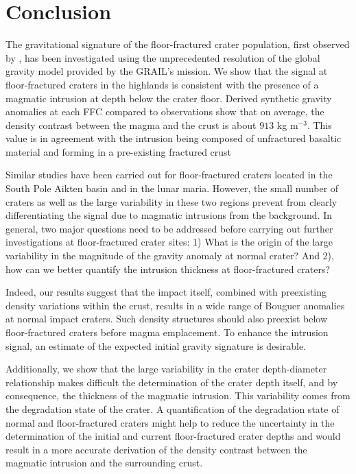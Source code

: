 \section{Conclusion}
\label{sec:conclusion}

The gravitational signature of  the floor-fractured crater population,
first observed by \citet{Schultz:1976kt},  has been investigated using
the unprecedented resolution  of the global gravity  model provided by
the  GRAIL's mission.   We  show that  the  signal at  floor-fractured
craters in the highlands is consistent with the presence of a magmatic
intrusion at depth below the  crater floor.  Derived synthetic gravity
anomalies at each  FFC compared to observations show  that on average,
the density contrast between the magma and the crust is about $913$ kg
m$^{-3}$. This value is in agreement with the intrusion being composed
of  unfractured  basaltic  material  and  forming  in  a  pre-existing
fractured crust \citep{Wieczorek:2013ipa}

Similar  studies have  been  carried out  for floor-fractured  craters
located  in the  South  Pole  Aikten basin  and  in  the lunar  maria.
However, the small number of craters  as well as the large variability
in these two  regions prevent from clearly  differentiating the signal
due to magmatic intrusions from the background.  In general, two major
questions   need  to   be  addressed   before  carrying   out  further
investigations at floor-fractured crater sites:  1) What is the origin
of the  large variability in the  magnitude of the gravity  anomaly at
normal  crater? And  2),  how  can we  better  quantify the  intrusion
thickness at floor-fractured craters?

Indeed,  our results  suggest that  the impact  itself, combined  with
preexisting density  variations within  the crust,  results in  a wide
range of  Bouguer anomalies  at normal  impact craters.   Such density
structures should  also preexist below floor-fractured  craters before
magma emplacement.   To enhance the  intrusion signal, an  estimate of
the expected initial gravity signature is desirable.

Additionally,  we  show  that  the large  variability  in  the  crater
depth-diameter relationship  makes difficult the determination  of the
crater depth itself, and by consequence, the thickness of the magmatic
intrusion.  This variability  comes from the degradation  state of the
crater.   A quantification  of  the degradation  state  of normal  and
floor-fractured craters  might help to  reduce the uncertainty  in the
determination of the initial and current floor-fractured crater depths
and would result in a more accurate derivation of the density contrast
between the magmatic intrusion and the surrounding crust.


